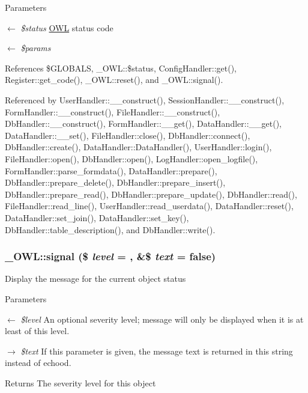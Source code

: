 \begin{DoxyParams}{Parameters}
\item[\mbox{$\leftarrow$} {\em \$status}]\hyperlink{classOWL}{OWL} status code \item[\mbox{$\leftarrow$} {\em \$params}]\end{DoxyParams}


References \$GLOBALS, \_\-OWL::\$status, ConfigHandler::get(), Register::get\_\-code(), \_\-OWL::reset(), and \_\-OWL::signal().



Referenced by UserHandler::\_\-\_\-construct(), SessionHandler::\_\-\_\-construct(), FormHandler::\_\-\_\-construct(), FileHandler::\_\-\_\-construct(), DbHandler::\_\-\_\-construct(), FormHandler::\_\-\_\-get(), DataHandler::\_\-\_\-get(), DataHandler::\_\-\_\-set(), FileHandler::close(), DbHandler::connect(), DbHandler::create(), DataHandler::DataHandler(), UserHandler::login(), FileHandler::open(), DbHandler::open(), LogHandler::open\_\-logfile(), FormHandler::parse\_\-formdata(), DataHandler::prepare(), DbHandler::prepare\_\-delete(), DbHandler::prepare\_\-insert(), DbHandler::prepare\_\-read(), DbHandler::prepare\_\-update(), DbHandler::read(), FileHandler::read\_\-line(), UserHandler::read\_\-userdata(), DataHandler::reset(), DataHandler::set\_\-join(), DataHandler::set\_\-key(), DbHandler::table\_\-description(), and DbHandler::write().

\subsubsection[{signal}]{\setlength{\rightskip}{0pt plus 5cm}\_\-OWL::signal (\$ {\em level} = {}, \/  \&\$ {\em text} = {\ttfamily false})}\label{class__OWL_a51ba4a16409acf2a2f61f286939091a5}
Display the message for the current object status


\begin{DoxyParams}{Parameters}
\item[\mbox{$\leftarrow$} {\em \$level}]An optional severity level; message will only be displayed when it is at least of this level. \item[\mbox{$\rightarrow$} {\em \$text}]If this parameter is given, the message text is returned in this string instead of echood. \end{DoxyParams}
\begin{DoxyReturn}{Returns}
The severity level for this object 
\end{DoxyReturn}


